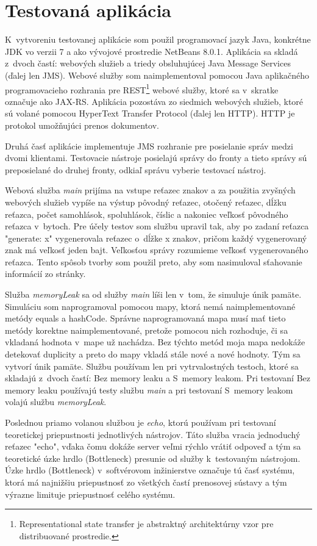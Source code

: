 \documentclass[12pt,oneside,final]{fithesis-utf8}
\begin{document}
\section{Testovaná aplikácia}
K~vytvoreniu testovanej aplikácie som použil programovací jazyk Java, konkrétne JDK vo verzii 7 a ako vývojové prostredie NetBeans 8.0.1. Aplikácia sa skladá z~dvoch častí: webových služieb a triedy obsluhujúcej Java Message Services (ďalej len JMS). Webové služby som naimplementoval pomocou Java aplikačného programovacieho rozhrania pre REST\footnote{Representational state transfer je abstraktný architektúrny vzor pre distribuované prostredie.} webové služby, ktoré sa v~skratke označuje ako JAX-RS. Aplikácia pozostáva zo siedmich webových služieb, ktoré sú volané pomocou HyperText Transfer Protocol (ďalej len HTTP). HTTP je protokol umožňujúci prenos dokumentov\cite{HTTP}.
\par Druhá časť aplikácie implementuje JMS rozhranie pre posielanie správ medzi dvomi klientami. Testovacie nástroje posielajú správy do fronty a tieto správy sú preposielané do druhej fronty, odkiaľ správu vyberie testovací nástroj.
\par Webová služba \textit{main} prijíma na vstupe reťazec znakov a za použitia zvyšných webových služieb vypíše na výstup pôvodný reťazec, otočený reťazec, dĺžku reťazca, počet samohlások, spoluhlások, číslic a nakoniec veľkosť pôvodného reťazca v~bytoch. Pre účely testov som službu upravil tak, aby po zadaní reťazca "{}generate: x" vygenerovala reťazec o~dĺžke x znakov, pričom každý vygenerovaný znak má veľkosť jeden bajt. Veľkosťou správy rozumieme veľkosť vygenerovaného reťazca. Tento spôsob tvorby som použil preto, aby som nasimuloval sťahovanie informácií zo stránky.
\par Služba \textit{memoryLeak} sa od služby \textit{main} líši len v~tom, že simuluje únik pamäte. Simuláciu som naprogramoval pomocou mapy, ktorá nemá naimplementované metódy equals a hashCode. Správne naprogramovaná mapa musí mať tieto metódy korektne naimplementované, pretože pomocou nich rozhoduje, či sa vkladaná hodnota v~mape už nachádza. Bez týchto metód moja mapa nedokáže detekovať duplicity a preto do mapy vkladá stále nové a nové hodnoty. Tým sa vytvorí únik pamäte. Službu používam len pri vytrvalostných testoch, ktoré sa skladajú z~dvoch častí: Bez memory leaku a S~memory leakom. Pri testovaní Bez memory leaku používajú testy službu \textit{main} a pri testovaní S~memory leakom volajú službu \textit{memoryLeak}.
\par Poslednou priamo volanou službou je \textit{echo}, ktorú používam pri testovaní teoretickej priepustnosti jednotlivých nástrojov. Táto služba vracia jednoduchý reťazec "{}echo", vďaka čomu dokáže server veľmi rýchlo vrátiť odpoveď a tým sa teoretické úzke hrdlo (Bottleneck) presunie od služby k~testovaným nástrojom. Úzke hrdlo (Bottleneck) v~softvérovom inžinierstve označuje tú časť systému, ktorá má najnižšiu priepustnosť zo všetkých častí prenosovej sústavy a tým výrazne limituje priepustnosť celého systému\cite{Wescott}.
\end{document}
